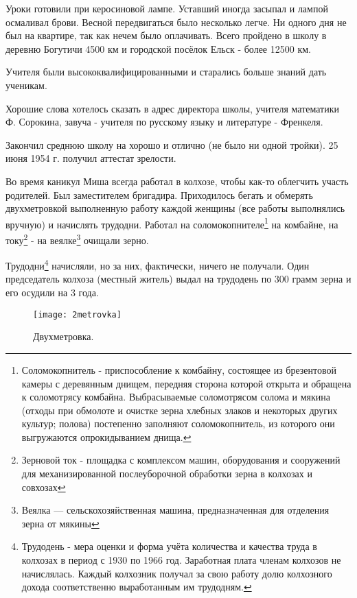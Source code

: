 Уроки готовили при керосиновой лампе. Уставший иногда засыпал и лампой осмаливал брови. Весной передвигаться было несколько легче. Ни одного дня не был на квартире, так как нечем было оплачивать. Всего пройдено в школу в деревню Богутичи 4500 км и городской посёлок Ельск - более 12500 км. 

Учителя были высококвалифицированными и старались больше знаний дать ученикам.

Хорошие слова хотелось сказать в адрес директора школы, учителя математики Ф. Сорокина, завуча - учителя по русскому языку и литературе - Френкеля. 

Закончил среднюю школу на хорошо и отлично (не было ни одной тройки). 25 июня 1954 г. получил аттестат зрелости.

Во время каникул Миша всегда работал в колхозе, чтобы как-то облегчить участь родителей. Был заместителем бригадира. Приходилось бегать и обмерять двухметровкой выполненную работу каждой женщины (все работы выполнялись вручную) и начислять трудодни. Работал на соломокопнителе\footnote{Соломокопнитель - приспособление к комбайну, состоящее из брезентовой камеры с деревянным днищем, передняя сторона которой открыта и обращена к соломотрясу комбайна. Выбрасываемые соломотрясом солома и мякина (отходы при обмолоте и очистке зерна хлебных злаков и некоторых других культур; полова) постепенно заполняют соломокопнитель, из которого они выгружаются опрокидыванием днища.} на комбайне, на току\footnote{Зерновой ток - площадка с комплексом машин, оборудования и сооружений для механизированной послеуборочной обработки зерна в колхозах и совхозах} - на веялке\footnote{Веялка — сельскохозяйственная машина, предназначенная для отделения зерна от мякины} очищали зерно.

Трудодни\footnote{Трудодень - мера оценки и форма учёта количества и качества труда в колхозах в период с 1930 по 1966 год. Заработная плата членам колхозов не начислялась. Каждый колхозник получал за свою работу долю колхозного дохода соответственно выработанным им трудодням.} начисляли, но за них, фактически, ничего не получали. Один председатель колхоза (местный житель) выдал на трудодень по 300 грамм зерна и его осудили на 3 года.

\begin{wrapfigure}{O}{.2\textwidth}
\centering
\texttt{[image: 2metrovka]}
\caption[Двухметровка.]{Двухметровка\footnotemark.}
\label{fig:2metrovka}
\end{wrapfigure}

